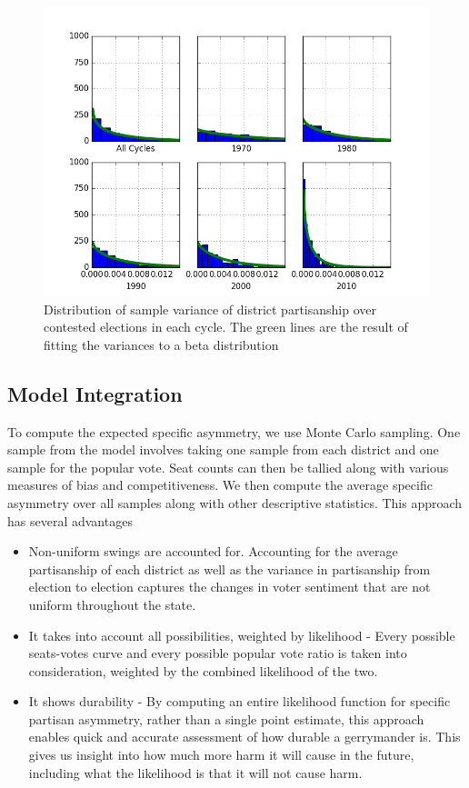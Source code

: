 \documentclass[preprint,12pt]{article}
\begin{document}
\begin{figure}[htb!]
    \begin{center}
        \includegraphics[scale=0.8]{../Figures/HistoricAsymmetry/VarHist.png}
        \caption{Distribution of sample variance of district partisanship over contested elections in each cycle. The green lines are the result of fitting the variances to a beta distribution}\label{fig:varHist}
    \end{center}
\end{figure}
\subsection{Model Integration}
To compute the expected specific asymmetry, we use Monte Carlo sampling.
One sample from the model involves taking one sample from each district and one sample for the popular vote.
Seat counts can then be tallied along with various measures of bias and competitiveness.
We then compute the average specific asymmetry over all samples along with other descriptive statistics.
This approach has several advantages

\begin{itemize}

\item Non-uniform swings are accounted for. Accounting for the average partisanship of each district as well as the variance in partisanship from election to election captures the changes in voter sentiment that are not uniform throughout the state.

\item It takes into account all possibilities, weighted by likelihood - Every possible seats-votes curve and every possible popular vote ratio is taken into consideration, weighted by the combined likelihood of the two.

\item It shows durability - By computing an entire likelihood function for specific partisan asymmetry, rather than a single point estimate, this approach enables quick and accurate assessment of how durable a gerrymander is. This gives us insight into how much more harm it will cause in the future, including what the likelihood is that it will not cause harm.

\end{itemize}
\end{document}
